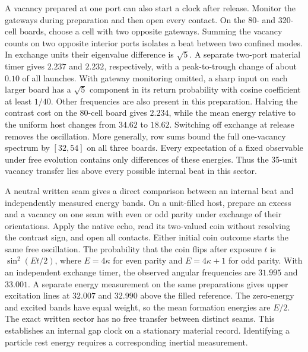 \documentclass[11pt]{article}
\theoremstyle{definition}
\theoremstyle{remark}
\theoremstyle{plain}
\begin{document}
A vacancy prepared at one port can also start a clock after release.
Monitor the gateways during preparation and then open every contact.
On the 80- and 320-cell boards, choose a cell with two opposite
gateways. Summing the vacancy counts on two opposite interior ports
isolates a beat between two confined modes. In exchange units their
eigenvalue difference is $\sqrt{5}$. A separate two-port material timer
gives $2.237$ and $2.232$, respectively, with a peak-to-trough change
of about $0.10$ of all launches. With gateway monitoring omitted,
a sharp input on each larger board has a $\sqrt{5}$ component in its
return probability with cosine coefficient at least $1/40$. Other
frequencies are also present in this preparation. Halving the contrast cost on the 80-cell
board gives $2.234$, while the mean energy relative to the uniform host
changes from $34.62$ to $18.62$. Switching off exchange at release
removes the oscillation. More generally, row sums bound the full
one-vacancy spectrum by $[32,54]$ on all three boards. Every expectation
of a fixed observable under free evolution contains only differences
of these energies. Thus the 35-unit vacancy transfer lies above
every possible internal beat in this sector.

A neutral written seam gives a direct comparison between an internal
beat and independently measured energy bands. On a unit-filled host,
prepare an excess and a vacancy on one seam with even or odd parity
under exchange of their orientations. Apply the native echo, read its
two-valued coin without resolving the contrast sign, and open all
contacts. Either initial coin outcome starts the same free oscillation.
The probability that the coin flips after exposure \(t\) is
\(\sin^2(Et/2)\), where \(E=4\kappa\) for even parity and
\(E=4\kappa+1\) for odd parity. With an independent exchange timer,
the observed angular frequencies are \(31.995\) and \(33.001\).
A separate energy measurement on the same preparations gives upper
excitation lines at \(32.007\) and \(32.990\) above the filled reference.
The zero-energy and excited bands have equal weight, so the mean
formation energies are \(E/2\). The exact written sector has no free
transfer between distinct seams. This establishes an internal gap
clock on a stationary material record. Identifying a particle rest
energy requires a corresponding inertial measurement.
\end{document}
